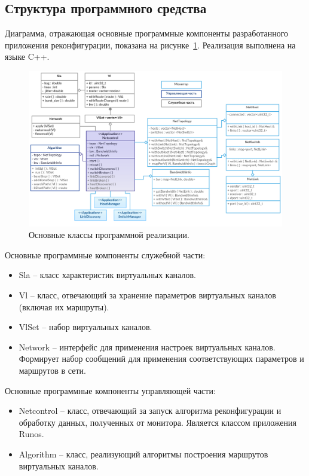 \documentclass[12pt, a4paper]{article}
\begin{document}
\subsection{Структура программного средства}
Диаграмма, отражающая основные программные компоненты разработанного приложения реконфигурации, показана на рисунке~\ref{pic:classes}. Реализация выполнена на языке C++.

\begin{figure}[h!]
	\centering
	\includegraphics[width=1.0\textwidth]{img/classes.png}
	\caption{Основные классы программной реализации.}
	\label{pic:classes}
\end{figure}


Основные программные компоненты служебной части:
\begin{itemize}
	\item Sla -- класс характеристик виртуальных каналов.
	\item Vl -- класс, отвечающий за хранение параметров виртуальных каналов (включая их маршруты).
	\item VlSet -- набор виртуальных каналов.
	\item Network -- интерфейс для применения настроек виртуальных каналов. Формирует набор сообщений для применения соответствующих параметров и маршрутов в сети.
\end{itemize}

Основные программные компоненты управляющей части:
\begin{itemize}
	\item Netcontrol -- класс, отвечающий за запуск алгоритма реконфигурации и обработку данных, полученных от монитора. Является классом приложения Runos.
	\item Algorithm -- класс, реализующий алгоритмы построения маршрутов виртуальных каналов.
\end{itemize}
\end{document}
